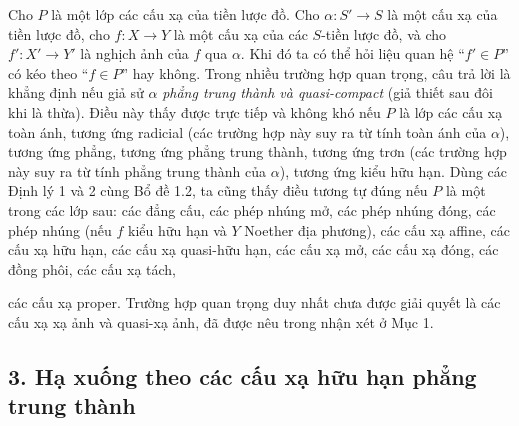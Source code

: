 Cho $P$ là một lớp các cấu xạ của tiền lược đồ. Cho
$\alpha:S'\longrightarrow S$ là một cấu xạ của tiền lược đồ, cho
$f:X\longrightarrow Y$ là một cấu xạ của các $S$-tiền lược đồ, và cho
$f':X'\longrightarrow Y'$ là nghịch ảnh của $f$ qua $\alpha$. Khi đó ta có thể
hỏi liệu quan hệ ``$f'\in P$'' có kéo theo ``$f\in P$'' hay không. Trong nhiều
trường hợp quan trọng, câu trả lời là khẳng định nếu giả sử $\alpha$
\emph{phẳng trung thành và quasi-compact} (giả thiết sau đôi khi là thừa). Điều
này thấy được trực tiếp và không khó nếu $P$ là lớp các cấu xạ toàn ánh, tương
ứng radicial (các trường hợp này suy ra từ tính toàn ánh của $\alpha$), tương
ứng phẳng, tương ứng phẳng trung thành, tương ứng trơn (các trường hợp này suy
ra từ tính phẳng trung thành của $\alpha$), tương ứng kiểu hữu hạn. Dùng các
Định lý 1 và 2 cùng Bổ đề 1.2, ta cũng thấy điều tương tự đúng nếu $P$ là một
trong các lớp sau: các đẳng cấu, các phép nhúng mở, các phép nhúng đóng, các
phép nhúng (nếu $f$ kiểu hữu hạn và $Y$ Noether địa phương), các cấu xạ affine,
các cấu xạ hữu hạn, các cấu xạ quasi-hữu hạn, các cấu xạ mở, các cấu xạ đóng,
các đồng phôi, các cấu xạ tách,

các cấu xạ proper. Trường hợp quan trọng duy nhất chưa được giải quyết là các
cấu xạ xạ ảnh và quasi-xạ ảnh, đã được nêu trong nhận xét ở Mục 1.

\subsection*{3. Hạ xuống theo các cấu xạ hữu hạn phẳng trung thành}

